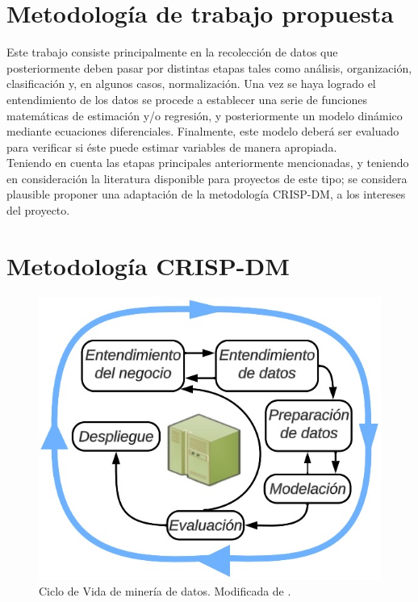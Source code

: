 \section{Metodología de trabajo propuesta}
Este trabajo consiste principalmente en la recolección de datos que posteriormente deben pasar por distintas etapas tales como análisis, organización, clasificación y, en algunos casos, normalización. Una vez se haya logrado el entendimiento de los datos se procede a establecer una serie de funciones matemáticas de estimación y/o regresión, y posteriormente un modelo dinámico mediante ecuaciones diferenciales. Finalmente, este modelo deberá ser evaluado para verificar si éste puede estimar variables de manera apropiada.\\

Teniendo en cuenta las etapas principales anteriormente mencionadas, y teniendo en consideración la literatura disponible para proyectos de este tipo; se considera plausible proponer una adaptación de la metodología CRISP-DM, a los intereses del proyecto. 


\section{Metodología CRISP-DM}\label{crispmethod}

\begin{figure}[H]
    \centering
    \includegraphics[scale=0.50]{img/ciclocrispspa.jpg}
    \caption{Ciclo de Vida de minería de datos. Modificada de \cite{ibmcrisp}.}
    \label{ciclocrisp}
\end{figure}


